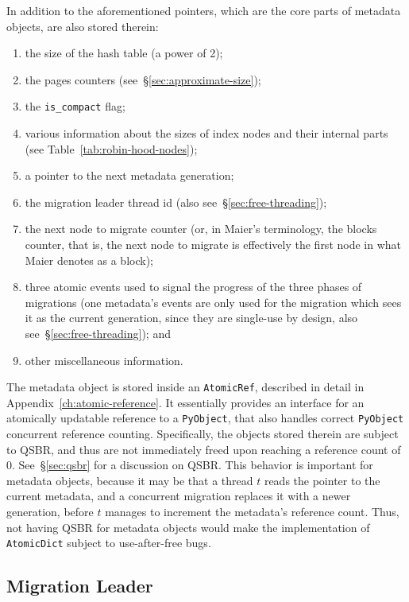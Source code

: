 In addition to the aforementioned pointers, which are the core parts of metadata objects, are also stored therein:
\begin{enumerate}
	\item the size of the hash table (a power of 2);
	\item the pages counters (see~\S\ref{sec:approximate-size});
	\item the \texttt{is\_compact} flag;
	\item various information about the sizes of index nodes and their internal parts (see Table~\ref{tab:robin-hood-nodes});
	\item a pointer to the next metadata generation;
	\item the migration leader thread id (also see~\S\ref{sec:free-threading});
	\item the next node to migrate counter (or, in Maier's terminology, the blocks counter, that is, the next node to migrate is effectively the first node in what Maier denotes as a block);
	\item three atomic events used to signal the progress of the three phases of migrations (one metadata's events are only used for the migration which sees it as the current generation, since they are single-use by design, also see~\S\ref{sec:free-threading}); and
	\item other miscellaneous information.
\end{enumerate}

The metadata object is stored inside an \texttt{AtomicRef}, described in detail in Appendix~\ref{ch:atomic-reference}.
It essentially provides an interface for an atomically updatable reference to a \texttt{PyObject}, that also handles correct \texttt{PyObject} concurrent reference counting.
Specifically, the objects stored therein are subject to QSBR, and thus are not immediately freed upon reaching a reference count of 0.
See~\S\ref{sec:qsbr} for a discussion on QSBR\@.
This behavior is important for metadata objects, because it may be that a thread $t$ reads the pointer to the current metadata, and a concurrent migration replaces it with a newer generation, before $t$ manages to increment the metadata's reference count.
Thus, not having QSBR for metadata objects would make the implementation of \texttt{AtomicDict} subject to use-after-free bugs.

\subsection{Migration Leader}\label{subsec:migration-leader}
